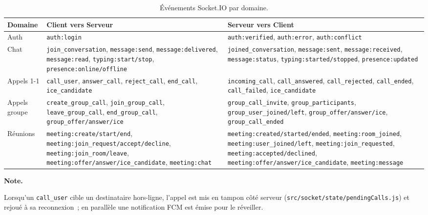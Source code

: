 \documentclass[11pt,a4paper,oneside]{report}
\newenvironment{note}[1][Note]{%
  \begin{tcolorbox}[enhanced, frame hidden, interior hidden,
    borderline west={3pt}{0pt}{AlanyaIndigo},
    left=10pt, top=3pt, bottom=3pt, sharp corners, colback=white,
    before skip=\medskipamount, after skip=\medskipamount]%
  \small\textbf{\textcolor{AlanyaIndigoDark}{#1.}}\space\ignorespaces
}{\end{tcolorbox}}
\newcommand{\thd}[1]{\textbf{\textcolor{AlanyaIndigoDark}{#1}}}
\begin{document}
\begin{table}[H]
\centering\small
\begin{tabularx}{\linewidth}{@{}l X X@{}}
\toprule
\thd{Domaine} & \thd{Client vers Serveur} & \thd{Serveur vers Client}\\
\midrule
Auth        & \texttt{auth:login} & \texttt{auth:verified}, \texttt{auth:error}, \texttt{auth:conflict}\\
Chat        & \texttt{join\_conversation}, \texttt{message:send}, \texttt{message:delivered}, \texttt{message:read}, \texttt{typing:start/stop}, \texttt{presence:online/offline} & \texttt{joined\_conversation}, \texttt{message:sent}, \texttt{message:received}, \texttt{message:status}, \texttt{typing:started/stopped}, \texttt{presence:updated}\\
Appels 1-1  & \texttt{call\_user}, \texttt{answer\_call}, \texttt{reject\_call}, \texttt{end\_call}, \texttt{ice\_candidate} & \texttt{incoming\_call}, \texttt{call\_answered}, \texttt{call\_rejected}, \texttt{call\_ended}, \texttt{call\_failed}, \texttt{ice\_candidate}\\
Appels groupe & \texttt{create\_group\_call}, \texttt{join\_group\_call}, \texttt{leave\_group\_call}, \texttt{end\_group\_call}, \texttt{group\_offer/answer/ice} & \texttt{group\_call\_invite}, \texttt{group\_participants}, \texttt{group\_user\_joined/left}, \texttt{group\_offer/answer/ice}, \texttt{group\_call\_ended}\\
R\'{e}unions  & \texttt{meeting:create/start/end}, \texttt{meeting:join\_request/accept/decline}, \texttt{meeting:join\_room/leave}, \texttt{meeting:offer/answer/ice\_candidate}, \texttt{meeting:chat} & \texttt{meeting:created/started/ended}, \texttt{meeting:room\_joined}, \texttt{meeting:user\_joined/left}, \texttt{meeting:join\_requested}, \texttt{meeting:accepted/declined}, \texttt{meeting:offer/answer/ice\_candidate}, \texttt{meeting:message}\\
\bottomrule
\end{tabularx}
\caption{\'{E}v\'{e}nements Socket.IO par domaine.}
\label{tab:socket}
\end{table}

\begin{note}
Lorsqu'un \texttt{call\_user} cible un destinataire hors-ligne, l'appel est mis
en tampon c\^{o}t\'{e} serveur (\texttt{src/socket/state/pendingCalls.js}) et rejou\'{e} \`{a}
sa reconnexion~; en parall\`{e}le une notification FCM est \'{e}mise pour le r\'{e}veiller.
\end{note}
\end{document}
